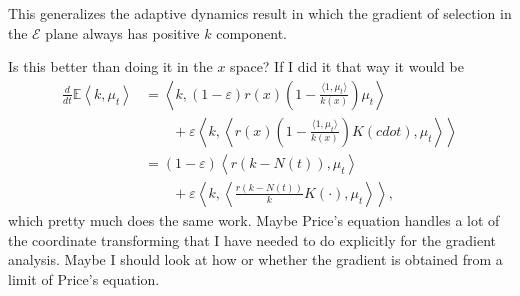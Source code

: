 \documentclass[11pt]{amsart}
\theoremstyle{remark}
\theoremstyle{definition}
\begin{document}
This generalizes the adaptive dynamics result in which the gradient
of selection in the $\mathcal{E}$ plane always has positive $k$
component.

Is this better than doing it in the $x$ space? If I did it that way it
would be
\begin{align*}
	\frac{d}{dt}\mathbb{E}\left\langle k, \mu_t \right\rangle
	&= \left\langle k, (1-\varepsilon) r(x) \left( 1 - \frac{\langle 1,\mu_t\rangle}{k(x)} \right) \mu_t \right\rangle \\
	& \qquad\mbox{} + \varepsilon \left\langle k, \left\langle r(x) \left( 1 - \frac{\langle 1, \mu_t\rangle}{k(x)} \right) K(cdot), \mu_t \right\rangle \right\rangle \\
	&= (1-\varepsilon) \left\langle r (k - N(t)), \mu_t \right\rangle \\
	& \qquad\mbox{} + \varepsilon \left\langle k, \left\langle \frac{r \left( k - N(t) \right)}{k} K(\cdot), \mu_t \right\rangle \right\rangle ,
\end{align*}
which pretty much does the same work.  Maybe Price's equation handles a lot of
the coordinate transforming that I have needed to do explicitly for the
gradient analysis.
Maybe I should look at how or whether the gradient is obtained from a
limit of Price's equation.

%


\vfill
\end{document}
